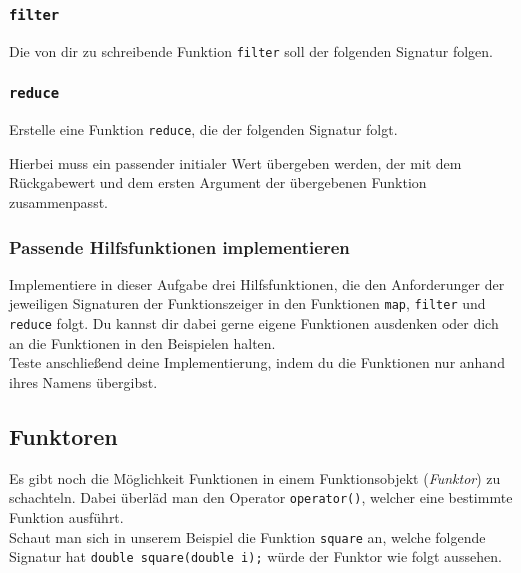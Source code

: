 \subsubsection{\lstinline{filter}}

Die von dir zu schreibende Funktion \lstinline{filter} soll der folgenden Signatur folgen.



\subsubsection{\lstinline{reduce}}

Erstelle eine Funktion \lstinline{reduce}, die der folgenden Signatur folgt.



Hierbei muss ein passender initialer Wert übergeben werden, der mit dem Rückgabewert und dem ersten Argument der übergebenen Funktion zusammenpasst.

\subsubsection{Passende Hilfsfunktionen implementieren}
Implementiere in dieser Aufgabe drei Hilfsfunktionen, die den Anforderunger der jeweiligen Signaturen der Funktionszeiger in den Funktionen \lstinline{map}, \lstinline{filter} und \lstinline{reduce} folgt.
Du kannst dir dabei gerne eigene Funktionen ausdenken oder dich an die Funktionen in den Beispielen halten. \\

Teste anschließend deine Implementierung, indem du die Funktionen nur anhand ihres Namens übergibst.

\subsection{Funktoren}
\label{sec:functional_functor}
Es gibt noch die Möglichkeit Funktionen in einem Funktionsobjekt (\emph{Funktor}) zu schachteln.
Dabei überläd man den Operator \lstinline{operator()}, welcher eine bestimmte Funktion ausführt. \\

Schaut man sich in unserem Beispiel die Funktion \lstinline{square} an, welche folgende Signatur hat \lstinline{double square(double i);} würde der Funktor wie folgt aussehen.

